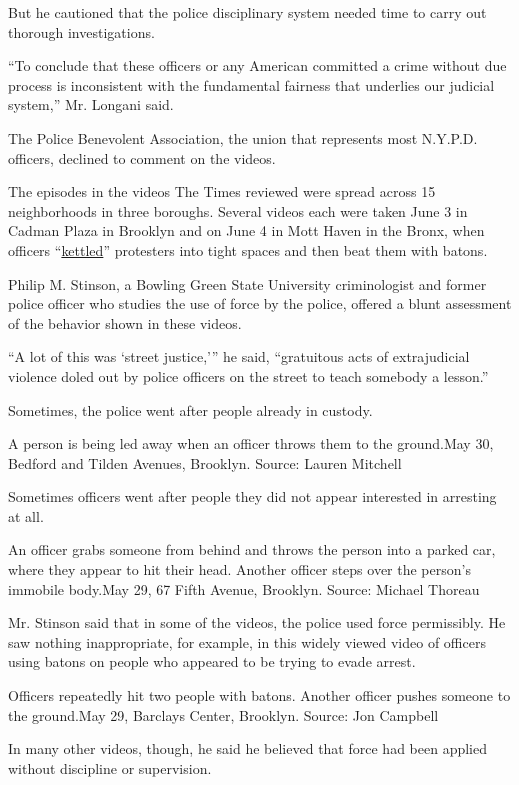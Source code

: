 But he cautioned that the police disciplinary system needed time to
carry out thorough investigations.

``To conclude that these officers or any American committed a crime
without due process is inconsistent with the fundamental fairness that
underlies our judicial system,'' Mr. Longani said.

The Police Benevolent Association, the union that represents most
N.Y.P.D. officers, declined to comment on the videos.

The episodes in the videos The Times reviewed were spread across 15
neighborhoods in three boroughs. Several videos each were taken June 3
in Cadman Plaza in Brooklyn and on June 4 in Mott Haven in the Bronx,
when officers
``\href{https://www.nytimes3xbfgragh.onion/2020/06/05/nyregion/police-kettling-protests-nyc.html}{kettled}''
protesters into tight spaces and then beat them with batons.

Philip M. Stinson, a Bowling Green State University criminologist and
former police officer who studies the use of force by the police,
offered a blunt assessment of the behavior shown in these videos.

``A lot of this was `street justice,''' he said, ``gratuitous acts of
extrajudicial violence doled out by police officers on the street to
teach somebody a lesson.''

Sometimes, the police went after people already in custody.

A person is being led away when an officer throws them to the ground.May
30, Bedford and Tilden Avenues, Brooklyn. Source: Lauren Mitchell

Sometimes officers went after people they did not appear interested in
arresting at all.

An officer grabs someone from behind and throws the person into a parked
car, where they appear to hit their head. Another officer steps over the
person's immobile body.May 29, 67 Fifth Avenue, Brooklyn. Source:
Michael Thoreau

Mr. Stinson said that in some of the videos, the police used force
permissibly. He saw nothing inappropriate, for example, in this widely
viewed video of officers using batons on people who appeared to be
trying to evade arrest.

Officers repeatedly hit two people with batons. Another officer pushes
someone to the ground.May 29, Barclays Center, Brooklyn. Source: Jon
Campbell

In many other videos, though, he said he believed that force had been
applied without discipline or supervision.


